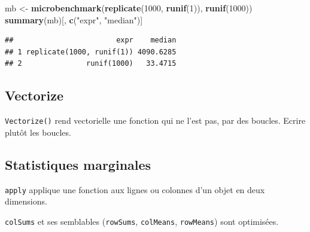 \documentclass[
  12pt,
  french,
  a4paper,
  extrafontsizes,onecolumn,openright
  ]{memoir}
\newenvironment{Shaded}{\begin{snugshade}}{\end{snugshade}}
\newcommand{\DecValTok}[1]{\textcolor[rgb]{0.00,0.00,0.81}{#1}}
\newcommand{\KeywordTok}[1]{\textcolor[rgb]{0.13,0.29,0.53}{\textbf{#1}}}
\newcommand{\NormalTok}[1]{#1}
\newcommand{\StringTok}[1]{\textcolor[rgb]{0.31,0.60,0.02}{#1}}
\begin{document}
\scriptsize

\begin{Shaded}
\begin{Highlighting}[]
\NormalTok{mb <-}\StringTok{ }\KeywordTok{microbenchmark}\NormalTok{(}\KeywordTok{replicate}\NormalTok{(}\DecValTok{1000}\NormalTok{, }\KeywordTok{runif}\NormalTok{(}\DecValTok{1}\NormalTok{)), }\KeywordTok{runif}\NormalTok{(}\DecValTok{1000}\NormalTok{))}
\KeywordTok{summary}\NormalTok{(mb)[, }\KeywordTok{c}\NormalTok{(}\StringTok{"expr"}\NormalTok{, }\StringTok{"median"}\NormalTok{)]}
\end{Highlighting}
\end{Shaded}

\begin{verbatim}
##                        expr    median
## 1 replicate(1000, runif(1)) 4090.6285
## 2               runif(1000)   33.4715
\end{verbatim}

\normalsize

\hypertarget{vectorize}{%
\subsection{Vectorize}\label{vectorize}}

\texttt{Vectorize()} rend vectorielle une fonction qui ne l'est pas, par des boucles.
Ecrire plutôt les boucles.

\hypertarget{statistiques-marginales}{%
\subsection{Statistiques marginales}\label{statistiques-marginales}}

\texttt{apply} applique une fonction aux lignes ou colonnes d'un objet en deux dimensions.

\texttt{colSums} et ses semblables (\texttt{rowSums}, \texttt{colMeans}, \texttt{rowMeans}) sont optimisées.

\scriptsize
\end{document}
